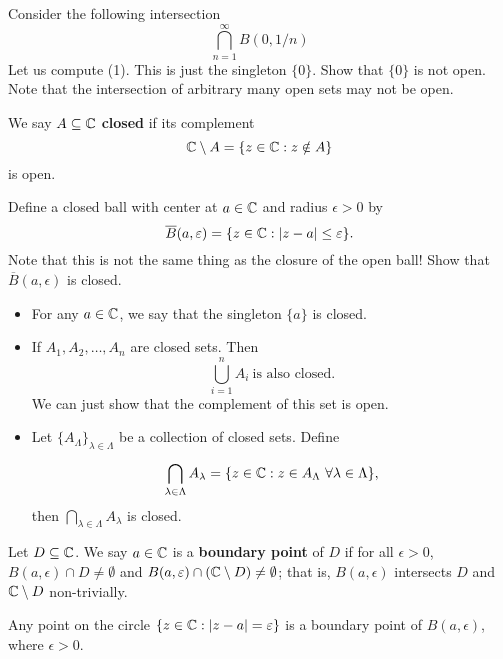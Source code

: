 \documentclass[a4paper]{report}
\begin{document}
\begin{eg}
    Consider the following intersection 
    \[  \bigcap_{ n=1  }^{ \infty  }  B(0,1/n)   \tag{1} \]
    Let us compute (1). This is just the singleton \( \{ 0 \}  \). Show that \( \{ 0  \}  \) is not open. Note that the intersection of arbitrary many open sets may not be open. 
\end{eg}

\begin{definition}
    We say \( A \subseteq \mathbb{C}   \) \textbf{closed} if its complement     
    \[  \mathbb{C} \setminus  A = \{ z \in \mathbb{C} : z \notin A  \}   \] is open.
\end{definition}
\begin{eg}
    Define a closed ball with center at \( a \in \mathbb{C}  \) and radius \( \epsilon > 0  \) by
    \[  \overline{B}(a, \varepsilon) = \{ z \in \mathbb{C} : | z - a  | \leq \varepsilon \}. \]
    Note that this is not the same thing as the closure of the open ball! Show that \( \overline{B}(a,\epsilon) \) is closed.
\end{eg}
\begin{eg}
    \begin{itemize}
\item For any \( a \in \mathbb{C}  \), we say that the singleton \( \{ a  \}   \) is closed.
\item If \( {A}_{1}, {A}_{2}, \dots, {A}_{n} \) are closed sets. Then 
    \[  \bigcup_{ i =1  }^{ n }  {A}_{i} \ \text{is also closed.} \]
    We can just show that the complement of this set is open.
\item Let \( \{ {A}_{\Lambda} \}_{\lambda \in \Lambda}   \) be a collection of closed sets. Define
    \[  \bigcap_{ \lambda \in \Lambda }^{  }  {A}_{\lambda} = \{ z \in \mathbb{C} : z \in {A}_{\Lambda} \ \forall \lambda \in \Lambda \},  \]
    then \( \bigcap_{  \lambda \in \Lambda }^{  } {A}_{\lambda } \) is closed.
\end{itemize}
\end{eg}

\begin{definition}
   Let \( D \subseteq  \mathbb{C}  \). We say \( a \in \mathbb{C}  \) is a \textbf{boundary point} of \( D  \) if for all \( \epsilon > 0  \), \( B(a,\epsilon) \cap D \neq \emptyset \) and \( B(a,\varepsilon) \cap (\mathbb{C} \setminus  D ) \neq \emptyset  \); that is, \( B(a,\epsilon) \) intersects \( D  \) and \( \mathbb{C} \setminus  D   \) non-trivially.  
\end{definition}

\begin{eg}
   Any point on the circle \( \{ z \in \mathbb{C} : | z - a  | = \varepsilon \}  \) is a boundary point of \( B(a,\epsilon) \), where \( \epsilon > 0  \).
\end{eg}
\end{document}
